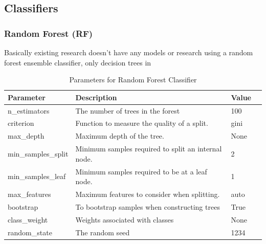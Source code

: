 \subsection{Classifiers}


\subsubsection{Random Forest (RF)}
\label{sec:RF}

Basically existing research doesn't have any models or research using a random forest ensemble classifier, only decision trees in \parencite{9360747}

\begin{table}[h]
\centering
\caption{Parameters for Random Forest Classifier}
\label{tab:rf-params}
\begin{tabular}{|l|l|l|l|}
\hline
\textbf{Parameter} & \textbf{Description} & \textbf{Value}  \\ \hline
n\_estimators & The number of trees in the forest & 100\\
criterion & Function to measure the quality of a split. & gini\\
max\_depth & Maximum depth of the tree. &  None \\
min\_samples\_split & Minimum samples required to split an internal node. & 2 \\ 
min\_samples\_leaf & Minimum samples required to be at a leaf node. & 1 \\
max\_features & Maximum features to consider when splitting.  & auto \\
bootstrap & To bootstrap samples when constructing trees & True \\
class\_weight & Weights associated with classes & None  \\
random\_state & The random seed & 1234 \\ \hline
\end{tabular}
\end{table}


